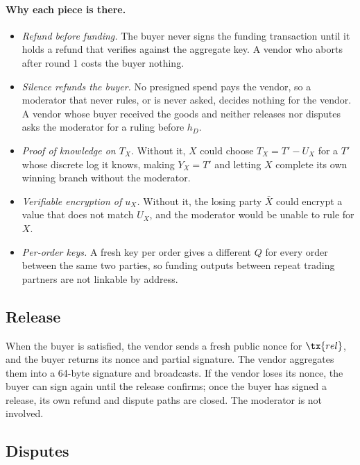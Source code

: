 \paragraph{Why each piece is there.}
\begin{itemize}
  \item \emph{Refund before funding.} The buyer never signs the funding transaction until it holds a refund that verifies against the aggregate key. A vendor who aborts after round 1 costs the buyer nothing.
  \item \emph{Silence refunds the buyer.} No presigned spend pays the vendor, so a moderator that never rules, or is never asked, decides nothing for the vendor. A vendor whose buyer received the goods and neither releases nor disputes asks the moderator for a ruling before $h_D$.
  \item \emph{Proof of knowledge on $T_X$.} Without it, $X$ could choose $T_X=T'-U_X$ for a $T'$ whose discrete log it knows, making $Y_X=T'$ and letting $X$ complete its own winning branch without the moderator.
  \item \emph{Verifiable encryption of $u_X$.} Without it, the losing party $\bar X$ could encrypt a value that does not match $U_X$, and the moderator would be unable to rule for $X$.
  \item \emph{Per-order keys.} A fresh key per order gives a different $Q$ for every order between the same two parties, so funding outputs between repeat trading partners are not linkable by address.
\end{itemize}

\subsection{Release}

When the buyer is satisfied, the vendor sends a fresh public nonce for $\tx{rel}$, and the buyer returns its nonce and partial signature. The vendor aggregates them into a 64-byte signature and broadcasts. If the vendor loses its nonce, the buyer can sign again until the release confirms; once the buyer has signed a release, its own refund and dispute paths are closed. The moderator is not involved.

\subsection{Disputes}

